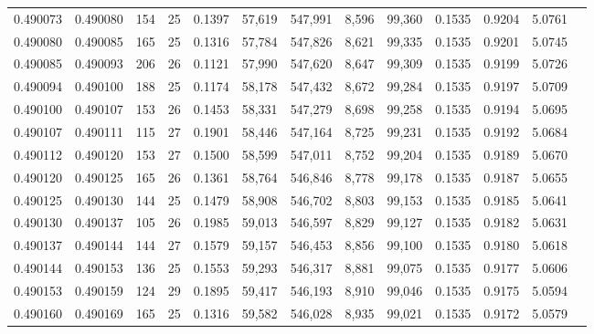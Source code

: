 \begin{tabular}{rrrrrrrrrrrrr}
0.490073 & 0.490080 & 154 &  25 &                                     0.1397 &  57,619 & 547,991 &   8,596 &  99,360 & 0.1535 & 0.9204 & 5.0761 \\
0.490080 & 0.490085 & 165 &  25 &                                     0.1316 &  57,784 & 547,826 &   8,621 &  99,335 & 0.1535 & 0.9201 & 5.0745 \\
0.490085 & 0.490093 & 206 &  26 &                                     0.1121 &  57,990 & 547,620 &   8,647 &  99,309 & 0.1535 & 0.9199 & 5.0726 \\
0.490094 & 0.490100 & 188 &  25 &                                     0.1174 &  58,178 & 547,432 &   8,672 &  99,284 & 0.1535 & 0.9197 & 5.0709 \\
0.490100 & 0.490107 & 153 &  26 &                                     0.1453 &  58,331 & 547,279 &   8,698 &  99,258 & 0.1535 & 0.9194 & 5.0695 \\
0.490107 & 0.490111 & 115 &  27 &                                     0.1901 &  58,446 & 547,164 &   8,725 &  99,231 & 0.1535 & 0.9192 & 5.0684 \\
0.490112 & 0.490120 & 153 &  27 &                                     0.1500 &  58,599 & 547,011 &   8,752 &  99,204 & 0.1535 & 0.9189 & 5.0670 \\
0.490120 & 0.490125 & 165 &  26 &                                     0.1361 &  58,764 & 546,846 &   8,778 &  99,178 & 0.1535 & 0.9187 & 5.0655 \\
0.490125 & 0.490130 & 144 &  25 &                                     0.1479 &  58,908 & 546,702 &   8,803 &  99,153 & 0.1535 & 0.9185 & 5.0641 \\
0.490130 & 0.490137 & 105 &  26 &                                     0.1985 &  59,013 & 546,597 &   8,829 &  99,127 & 0.1535 & 0.9182 & 5.0631 \\
0.490137 & 0.490144 & 144 &  27 &                                     0.1579 &  59,157 & 546,453 &   8,856 &  99,100 & 0.1535 & 0.9180 & 5.0618 \\
0.490144 & 0.490153 & 136 &  25 &                                     0.1553 &  59,293 & 546,317 &   8,881 &  99,075 & 0.1535 & 0.9177 & 5.0606 \\
0.490153 & 0.490159 & 124 &  29 &                                     0.1895 &  59,417 & 546,193 &   8,910 &  99,046 & 0.1535 & 0.9175 & 5.0594 \\
0.490160 & 0.490169 & 165 &  25 &                                     0.1316 &  59,582 & 546,028 &   8,935 &  99,021 & 0.1535 & 0.9172 & 5.0579 \\

\end{tabular}
